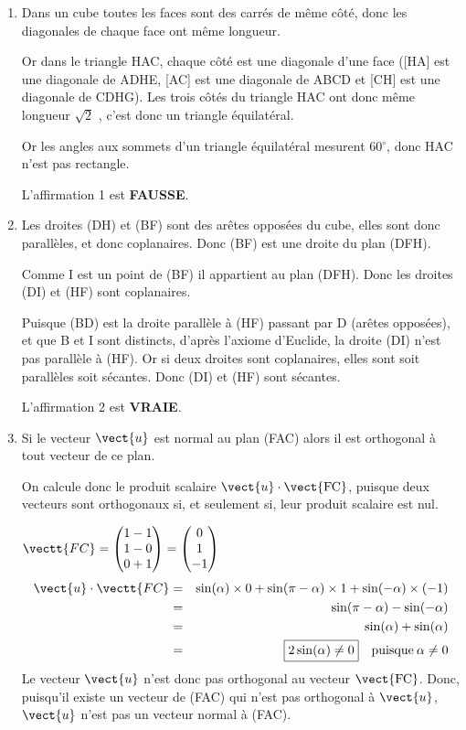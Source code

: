 \smallskip

\begin{enumerate}
	\item Dans un cube toutes les faces sont des carrés de même côté, donc les diagonales de chaque face ont même longueur.

Or dans le triangle HAC, chaque côté est une diagonale d'une face ([HA] est une diagonale de ADHE, [AC] est une diagonale de ABCD et [CH] est une diagonale de CDHG). Les trois côtés du triangle HAC ont donc même longueur $\sqrt2$
, c'est donc un triangle équilatéral.

Or les angles aux sommets d'un triangle équilatéral mesurent 60\ensuremath{^\circ}, donc HAC n'est pas rectangle.

\smallskip

L'affirmation 1 est \textbf{FAUSSE}.
	\item Les droites (DH) et (BF) sont des arêtes opposées du cube, elles sont donc parallèles, et donc coplanaires. Donc (BF) est une droite du plan (DFH).

Comme I est un point de (BF) il appartient au plan (DFH). Donc les droites (DI) et (HF) sont coplanaires.

Puisque (BD) est la droite parallèle à (HF) passant par D (arêtes opposées), et que B et I sont distincts, d'après l'axiome d'Euclide, la droite (DI) n'est pas parallèle à (HF). Or si deux droites sont coplanaires, elles sont soit parallèles soit sécantes. Donc (DI) et (HF) sont sécantes.

\smallskip
	
L'affirmation 2 est \textbf{VRAIE}.
	\item Si le vecteur $\vect{u}$ est normal au plan (FAC) alors il est orthogonal à tout vecteur de ce plan.

On calcule donc le produit scalaire $\vect{u} \cdot \vect{\text{FC}}$, puisque deux vecteurs sont orthogonaux si, et seulement si, leur produit scalaire est nul.
	
	$\vectt{FC} = \begin{pmatrix}1-1\\1-0\\0+1\end{pmatrix} = \begin{pmatrix}0\\1\\-1\end{pmatrix}$
\begin{eqnarray*}
\vect{u} \cdot \vectt{FC} &=& \sin(\alpha) \times 0 + \sin(\pi - \alpha) \times 1 + \sin(-\alpha) \times (-1)\\
		&=& \sin(\pi - \alpha) - \sin(-\alpha)\\
		&=& \sin(\alpha) + \sin(\alpha)\\
		&=& \boxed{2\sin(\alpha) \neq 0} \quad \text{puisque} \:\alpha \ne 0
	\end{eqnarray*}
	Le vecteur $\vect{u}$ n'est donc pas orthogonal au vecteur $\vect{\text{FC}}$. Donc, puisqu'il existe un vecteur de (FAC) qui n'est pas orthogonal à $\vect{u}$, $\vect{u}$ n'est pas un vecteur normal à (FAC).


\end{enumerate}
